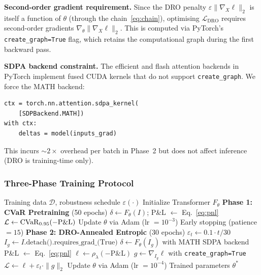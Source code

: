 \textbf{Second-order gradient requirement.}  Since the DRO penalty $\varepsilon\|\nabla_X\ell\|_2$ is itself a function of $\theta$ (through the chain~\eqref{eq:chain}), optimising $\mathcal{L}_{\mathrm{DRO}}$ requires second-order gradients $\nabla_\theta\|\nabla_X\ell\|_2$.  This is computed via PyTorch's \texttt{create\_graph=True} flag, which retains the computational graph during the first backward pass.

\textbf{SDPA backend constraint.}  The efficient and flash attention backends in PyTorch implement fused CUDA kernels that do not support \texttt{create\_graph}.  We force the MATH backend:
\begin{verbatim}
ctx = torch.nn.attention.sdpa_kernel(
    [SDPBackend.MATH])
with ctx:
    deltas = model(inputs_grad)
\end{verbatim}
This incurs $\sim$$2\times$ overhead per batch in Phase~2 but does not affect inference (DRO is training-time only).


\subsubsection{Three-Phase Training Protocol}

\begin{algorithm}[t]
\caption{W-DRO-T Training Protocol}
\label{alg:wdrot}
\begin{algorithmic}[1]
\REQUIRE Training data $\mathcal{D}$, robustness schedule $\varepsilon(\cdot)$
\STATE Initialize Transformer $F_\theta$
\STATE \textbf{Phase 1: CVaR Pretraining} (50 epochs)
        \STATE $\delta \gets F_\theta(I)$; \quad P\&L $\gets$ Eq.~\eqref{eq:pnl}
        \STATE $\mathcal{L} \gets \mathrm{CVaR}_{0.95}(-\text{P\&L})$
        \STATE Update $\theta$ via Adam (lr $= 10^{-3}$)
    \ENDFOR
    \STATE Early stopping (patience $= 15$)
\ENDFOR
\STATE \textbf{Phase 2: DRO-Annealed Entropic} (30 epochs)
    \STATE $\varepsilon_t \gets 0.1 \cdot t / 30$ 
        \STATE $I_g \gets I.\text{detach().requires\_grad\_(True)}$
        \STATE $\delta \gets F_\theta(I_g)$ with MATH SDPA backend
        \STATE P\&L $\gets$ Eq.~\eqref{eq:pnl}
        \STATE $\ell \gets \rho_\lambda(-\text{P\&L})$
        \STATE $g \gets \nabla_{I_g} \ell$ with \texttt{create\_graph=True}
        \STATE $\mathcal{L} \gets \ell + \varepsilon_t \cdot \|g\|_2$
        \STATE Update $\theta$ via Adam (lr $= 10^{-4}$)
    \ENDFOR
\ENDFOR
\RETURN Trained parameters $\theta^*$
\end{algorithmic}
\end{algorithm}

